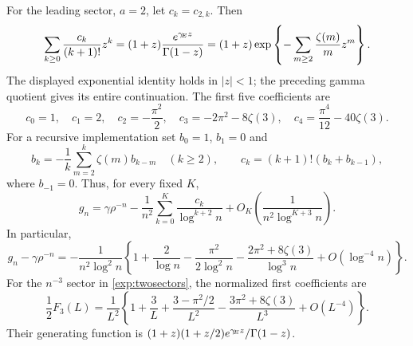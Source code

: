 For the leading sector, $a=2$, let $c_k=c_{2,k}$. Then
\begin{equation}\label{exp:maincoeffgen}
 \sum_{k\geq0}\frac{c_k}{(k+1)!}z^k
 =(1+z)\frac{e^{\gamma_{\!E} z}}{\Gamma(1-z)}
 =(1+z)\exp\left\{-\sum_{m\geq2}\frac{\zeta(m)}m z^m\right\}.
\end{equation}
The displayed exponential identity holds in $|z|<1$; the preceding gamma
quotient gives its entire continuation. The first five coefficients are
\[
 c_0=1,\quad c_1=2,\quad c_2=-\frac{\pi^2}{2},\quad
 c_3=-2\pi^2-8\zeta(3),\quad
 c_4=\frac{\pi^4}{12}-40\zeta(3).
\]
For a recursive implementation set $b_0=1$, $b_1=0$ and
\[
 b_k=-\frac1k\sum_{m=2}^{k}\zeta(m)b_{k-m}\quad(k\geq2),
 \qquad c_k=(k+1)!(b_k+b_{k-1}),
\]
where $b_{-1}=0$. Thus, for every fixed $K$,
\begin{equation}\label{exp:mainresult}
 g_n=\gamma\rho^{-n}
 -\frac1{n^2}\sum_{k=0}^{K}\frac{c_k}{\log^{k+2}n}
 +O_K\left(\frac1{n^2\log^{K+3}n}\right).
\end{equation}
In particular,
\[
 g_n-\gamma\rho^{-n}
 =-\frac1{n^2\log^2n}
 \left\{1+\frac2{\log n}-\frac{\pi^2}{2\log^2n}
       -\frac{2\pi^2+8\zeta(3)}{\log^3n}
       +O(\log^{-4}n)\right\}.
\]
For the $n^{-3}$ sector in \eqref{exp:twosectors}, the normalized first
coefficients are
\[
 \frac12F_3(L)=\frac1{L^2}
 \left\{1+\frac3L+\frac{3-\pi^2/2}{L^2}
              -\frac{3\pi^2+8\zeta(3)}{L^3}+O(L^{-4})\right\}.
\]
Their generating function is
$(1+z)(1+z/2)e^{\gamma_{\!E} z}/\Gamma(1-z)$.

